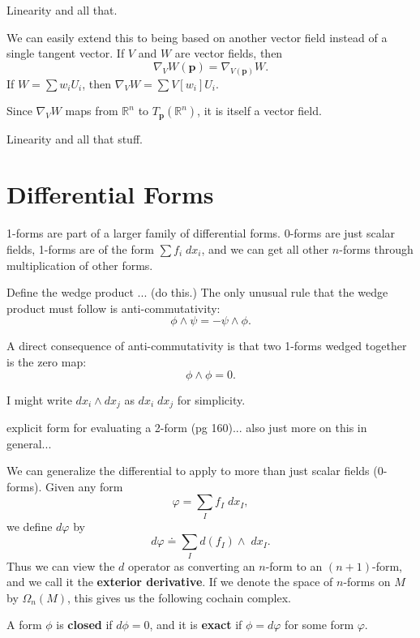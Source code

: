 \documentclass[twoside,10pt]{report}
\begin{document}
{\color{red}Linearity and all that.}

We can easily extend this to being based on another vector field instead of a single tangent vector. If $V$ and $W$ are vector fields, then
\[
	\nabla_{V}W(\mathbf{p}) = \nabla_{V(\mathbf{p})}W.
\] If $W = \sum w_i U_i$, then $\nabla_{V}W = \sum V[w_i] U_i$.

Since $\nabla_{V}W$ maps from $\mathbb{R}^n$ to $T_{\mathbf{p}}(\mathbb{R}^n)$, it is itself a vector field.

{\color{red}Linearity and all that stuff.}



\section{Differential Forms}

1-forms are part of a larger family of differential forms. 0-forms are just scalar fields, 1-forms are of the form $\sum f_i \;dx_i$, and we can get all other $n$-forms through multiplication of other forms.

Define the wedge product ... {\color{red}(do this.)} The only unusual rule that the wedge product must follow is anti-commutativity:
\[
\phi \wedge \psi = - \psi \wedge \phi.
\] 

\begin{ex}
A direct consequence of anti-commutativity is that two 1-forms wedged together is the zero map:
\[
\phi\wedge\phi = 0.
\] 
\end{ex}

\begin{note}
I might write $dx_i \wedge dx_j$ as $dx_i\;dx_j$ for simplicity.
\end{note}

{\color{red}explicit form for evaluating a 2-form (pg 160)... also just more on this in general...}

We can generalize the differential to apply to more than just scalar fields (0-forms). Given any form
\[
\varphi = \sum_{I} f_I \;dx_I,
\] we define $d\varphi$ by
\[
	d\varphi \doteq \sum_{I} d(f_I)\wedge \;dx_I.
\] 
Thus we can view the $d$ operator as converting an $n$-form to an $(n+1)$-form, and we call it the \textbf{exterior derivative}. If we denote the space of $n$-forms on $M$ by $\Omega_n(M)$, this gives us the following cochain complex.
\begin{figure}[H]
	\centering
{}
\end{figure}
A form $\phi$ is \textbf{closed} if $d\phi=0$, and it is \textbf{exact} if $\phi = d\varphi$ for some form $\varphi$.
\end{document}
